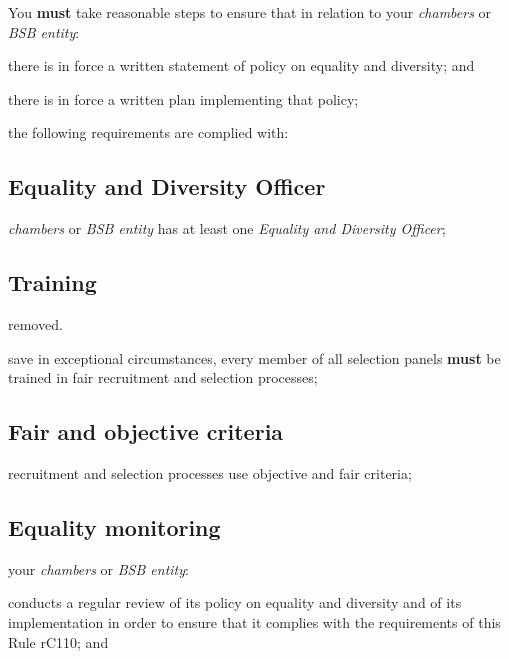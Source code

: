 You \textcolor{myred}{\textbf{must}} take reasonable steps to ensure that in relation to your
\emph{chambers} or \emph{BSB entity}:
\begin{numlist}
\item there is in force a written statement of policy on equality and
diversity; and

\item there is in force a written plan implementing that policy;

\item the following requirements are complied with:
\subsection{Equality and Diversity Officer}
\begin{alphlist}

\item \emph{chambers} or \emph{BSB entity} has at least one \emph{Equality
and Diversity Officer};

\subsection{Training}

\item removed.

\item save in exceptional circumstances, every member of all selection
panels \textcolor{myred}{\textbf{must}} be trained in fair recruitment and selection processes;

\subsection{Fair and objective criteria}

\item recruitment and selection processes use objective and fair criteria;

\subsection{Equality monitoring}

\item your \emph{chambers} or \emph{BSB entity}:
\begin{romlist}
\item conducts a regular review of its policy on equality and diversity and
of its implementation in order to ensure that it complies with the
requirements of this Rule rC110; and


\end{romlist}
\end{alphlist}
\end{numlist}
